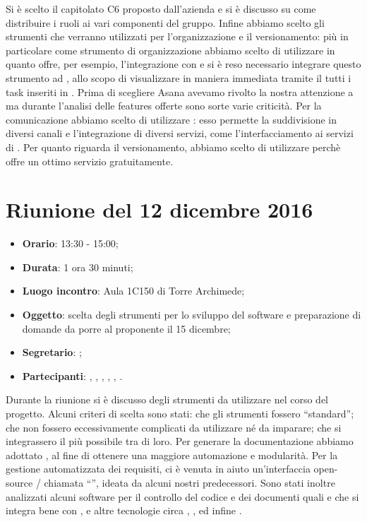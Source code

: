 Si è scelto il capitolato C6 \proj{} proposto dall'azienda \ZU{} e si è discusso su come distribuire i ruoli ai vari componenti del gruppo.
Infine abbiamo scelto gli strumenti che verranno utilizzati per l'organizzazione e il versionamento: più in particolare come strumento di organizzazione abbiamo scelto di utilizzare  in quanto offre, per esempio, l'integrazione con  e si è reso necessario integrare questo strumento ad , allo scopo di visualizzare in maniera immediata tramite il  tutti i task inseriti in . Prima di scegliere Asana avevamo rivolto la nostra attenzione a  ma durante l'analisi delle features offerte sono sorte varie criticità. Per la comunicazione abbiamo scelto di utilizzare : esso permette la suddivisione in diversi canali e l'integrazione di diversi servizi, come l'interfacciamento ai servizi di . Per quanto riguarda il versionamento, abbiamo scelto di utilizzare   perchè offre un ottimo servizio gratuitamente.



\section{Riunione del 12 dicembre 2016}

\begin{itemize}
	\item \textbf{Orario}: 13:30 - 15:00;
	\item \textbf{Durata}: 1 ora 30 minuti;
	\item \textbf{Luogo incontro}: Aula 1C150 di Torre Archimede; 
	\item \textbf{Oggetto}: scelta degli strumenti per lo sviluppo del software e preparazione di domande da porre al proponente il 15 dicembre;
	\item \textbf{Segretario}: \PB; 
	\item \textbf{Partecipanti}: \AZ, \GG, \LB, \LS, \MM, \PB.
\end{itemize}

Durante la riunione si è discusso degli strumenti da utilizzare nel corso del progetto. Alcuni criteri di scelta sono stati: che gli strumenti fossero “standard”; che non fossero eccessivamente complicati da utilizzare né da imparare; che si integrassero il più possibile tra di loro. Per generare la documentazione abbiamo adottato , al fine di ottenere una maggiore automazione e modularità. Per la gestione automatizzata dei requisiti, ci è venuta in aiuto un'interfaccia open-source / chiamata “”, ideata da alcuni nostri predecessori. Sono stati inoltre analizzati alcuni software per il controllo del codice e dei documenti quali  e  che si integra bene con , e altre tecnologie circa , ,  ed infine .

